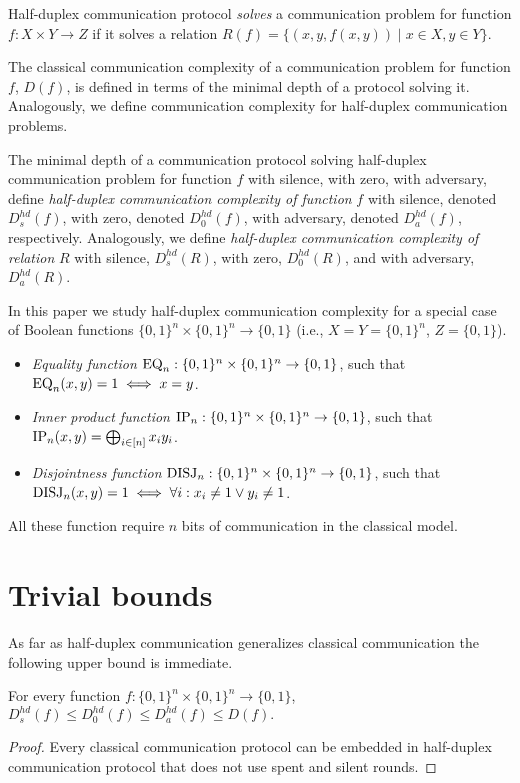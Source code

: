 \begin{definition}
Half-duplex communication protocol \emph{solves} a communication 
problem for function $f:X\times Y\to Z$ 
if it solves a relation $R(f) = \{(x,y,f(x,y))\mid x\in X, y\in Y\}$.
\end{definition}

The classical communication complexity of a communication problem for function $f$, $D(f)$, is defined
in terms of the minimal depth of a protocol solving it. Analogously, we define
communication complexity for half-duplex communication problems.
\begin{definition}
The minimal depth of a communication protocol solving half-duplex communication problem for function
$f$ with silence, with zero, with adversary, define \emph{half-duplex communication complexity of function}
$f$ with silence, denoted $D^{hd}_s(f)$, with zero, denoted $D^{hd}_0(f)$, with adversary, denoted
$D^{hd}_a(f)$, respectively. Analogously, we define \emph{half-duplex communication complexity of relation} $R$ with silence, $D^{hd}_s(R)$, with zero, $D^{hd}_0(R)$, and with adversary, $D^{hd}_a(R)$.
\end{definition}

In this paper we study half-duplex communication complexity for a special case of Boolean 
functions $\{0,1\}^n\times\{0,1\}^n\to \{0,1\}$ (i.e., $X=Y=\{0,1\}^n$, $Z=\{0,1\}$).
\begin{definition}\mbox{}
\begin{itemize}
    \item \emph{Equality function$  $} $\mathrm{EQ}_n: \{0,1\}^n\times\{0,1\}^n\to \{0,1\}$, such that $\mathrm{EQ}_n(x,y) = 1 \iff x=y$.
    \item \emph{Inner product function} $\mathrm{IP}_n:\{0,1\}^n\times\{0,1\}^n\to \{0,1\}$, such that $\mathrm{IP}_n(x,y) = \bigoplus_{i\in[n]} x_i y_i$.
    \item \emph{Disjointness function} $\mathrm{DISJ}_n:\{0,1\}^n\times\{0,1\}^n\to \{0,1\}$, such that 
    $\mathrm{DISJ}_n(x,y) = 1 \iff \forall i: x_i \neq 1 \lor y_i \neq 1$.
\end{itemize}
All these function require $n$ bits of communication in the classical model.
\end{definition}

\section{Trivial bounds}\label{sec:trivial-bounds}
As far as half-duplex communication generalizes classical 
communication the following upper bound is immediate.
\begin{theorem}\label{thm:trivial-ub}
For every function $f:\{0,1\}^n\times \{0,1\}^n \to \{0,1\}$,
$D^{hd}_s(f)\le D^{hd}_0(f)\le D^{hd}_a(f)\le D(f).$
\end{theorem}
\begin{proof}
Every classical communication protocol can be embedded in half-duplex communication protocol
that does not use spent and silent rounds.
\end{proof}


